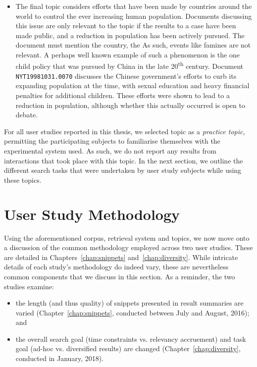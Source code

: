 \begin{itemize}
    \item{ The final topic considers efforts that have been made by countries around the world to control the ever increasing human population. Documents discussing this issue are only relevant to the topic if the results to a case have been made public, and a reduction in population has been actively pursued. The document must mention the country, the As such, events like famines are not relevant. A perhaps well known example of such a phenomenon is the one child policy that was pursued by China in the late 20\textsuperscript{th} century. Document \texttt{NYT19981031.0070} discusses the Chinese government's efforts to curb its expanding population at the time, with sexual education and heavy financial penalties for additional children. These efforts were shown to lead to a reduction in population, although whether this actually occurred is open to debate.}
    
\end{itemize}

For all user studies reported in this thesis, we selected topic  as a \emph{practice topic,} permitting the participating subjects to familiarise themselves with the experimental system used. As such, we do not report any results from interactions that took place with this topic. In the next section, we outline the different search tasks that were undertaken by user study subjects while using these topics.

\section{User Study Methodology}\label{sec:methodology:user}
Using the aforementioned corpus, retrieval system and topics, we now move onto a discussion of the common methodology employed across two user studies. These are detailed in Chapters~\ref{chap:snippets} and~\ref{chap:diversity}. While intricate details of each study's methodology do indeed vary, these are nevertheless common components that we discuss in this section. As a reminder, the two studies examine:

\begin{itemize}
    \item{the length (and thus quality) of snippets presented in result summaries are varied (Chapter~\ref{chap:snippets}, conducted between July and August, 2016); and}

    \item{the overall search goal (time constraints vs. relevancy accruement) and task goal (ad-hoc vs. diversified results) are changed (Chapter~\ref{chap:diversity}, conducted in January, 2018).}
\end{itemize}
\vspace*{-4mm}

